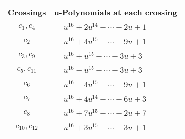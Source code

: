 \documentclass[1p]{elsarticle_modified}
\theoremstyle{definition}
\begin{document}
\begin{tabular}{m{50pt}|m{274pt}}
Crossings & \hspace{64pt}u-Polynomials at each crossing \\
\hline $$\begin{aligned}c_{1},c_{4}\end{aligned}$$&$\begin{aligned}
&u^{16}+2 u^{14}+\cdots+2 u+1
\end{aligned}$\\
\hline $$\begin{aligned}c_{2}\end{aligned}$$&$\begin{aligned}
&u^{16}+4 u^{15}+\cdots+9 u+1
\end{aligned}$\\
\hline $$\begin{aligned}c_{3},c_{9}\end{aligned}$$&$\begin{aligned}
&u^{16}+u^{15}+\cdots-3 u+3
\end{aligned}$\\
\hline $$\begin{aligned}c_{5},c_{11}\end{aligned}$$&$\begin{aligned}
&u^{16}- u^{15}+\cdots+3 u+3
\end{aligned}$\\
\hline $$\begin{aligned}c_{6}\end{aligned}$$&$\begin{aligned}
&u^{16}-4 u^{15}+\cdots-9 u+1
\end{aligned}$\\
\hline $$\begin{aligned}c_{7}\end{aligned}$$&$\begin{aligned}
&u^{16}+4 u^{14}+\cdots+6 u+3
\end{aligned}$\\
\hline $$\begin{aligned}c_{8}\end{aligned}$$&$\begin{aligned}
&u^{16}+7 u^{15}+\cdots+2 u+7
\end{aligned}$\\
\hline $$\begin{aligned}c_{10},c_{12}\end{aligned}$$&$\begin{aligned}
&u^{16}+3 u^{15}+\cdots+3 u+1
\end{aligned}$\\
\hline
\end{tabular}\\~\\
\end{document}
